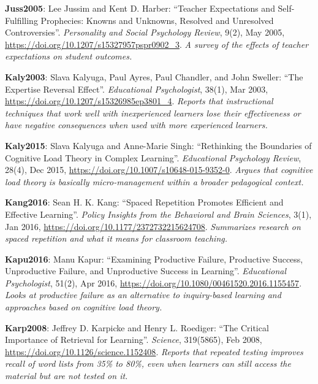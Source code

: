 \textbf{\hypertarget{b:Juss2005}{Juss2005}\label{b:Juss2005}}: Lee Jussim and Kent D. Harber: ``Teacher Expectations and Self-Fulfilling Prophecies: Knowns and Unknowns, Resolved and Unresolved Controversies''. \emph{Personality and Social Psychology Review}, 9(2), May 2005, \url{https://doi.org/10.1207/s15327957pspr0902_3}. \emph{A survey of the effects of teacher expectations on student outcomes.}

\textbf{\hypertarget{b:Kaly2003}{Kaly2003}\label{b:Kaly2003}}: Slava Kalyuga, Paul Ayres, Paul Chandler, and John Sweller: ``The Expertise Reversal Effect''. \emph{Educational Psychologist}, 38(1), Mar 2003, \url{https://doi.org/10.1207/s15326985ep3801_4}. \emph{Reports that instructional techniques that work well with inexperienced learners lose their effectiveness or have negative consequences when used with more experienced learners.}

\textbf{\hypertarget{b:Kaly2015}{Kaly2015}\label{b:Kaly2015}}: Slava Kalyuga and Anne-Marie Singh: ``Rethinking the Boundaries of Cognitive Load Theory in Complex Learning''. \emph{Educational Psychology Review}, 28(4), Dec 2015, \url{https://doi.org/10.1007/s10648-015-9352-0}. \emph{Argues that cognitive load theory is basically micro-management within a broader pedagogical context.}

\textbf{\hypertarget{b:Kang2016}{Kang2016}\label{b:Kang2016}}: Sean H. K. Kang: ``Spaced Repetition Promotes Efficient and Effective Learning''. \emph{Policy Insights from the Behavioral and Brain Sciences}, 3(1), Jan 2016, \url{https://doi.org/10.1177/2372732215624708}. \emph{Summarizes research on spaced repetition and what it means for classroom teaching.}

\textbf{\hypertarget{b:Kapu2016}{Kapu2016}\label{b:Kapu2016}}: Manu Kapur: ``Examining Productive Failure, Productive Success, Unproductive Failure, and Unproductive Success in Learning''. \emph{Educational Psychologist}, 51(2), Apr 2016, \url{https://doi.org/10.1080/00461520.2016.1155457}. \emph{Looks at productive failure as an alternative to inquiry-based learning and approaches based on cognitive load theory.}

\textbf{\hypertarget{b:Karp2008}{Karp2008}\label{b:Karp2008}}: Jeffrey D. Karpicke and Henry L. Roediger: ``The Critical Importance of Retrieval for Learning''. \emph{Science}, 319(5865), Feb 2008, \url{https://doi.org/10.1126/science.1152408}. \emph{Reports that repeated testing improves recall of word lists from 35\% to 80\%, even when learners can still access the material but are not tested on it.}

